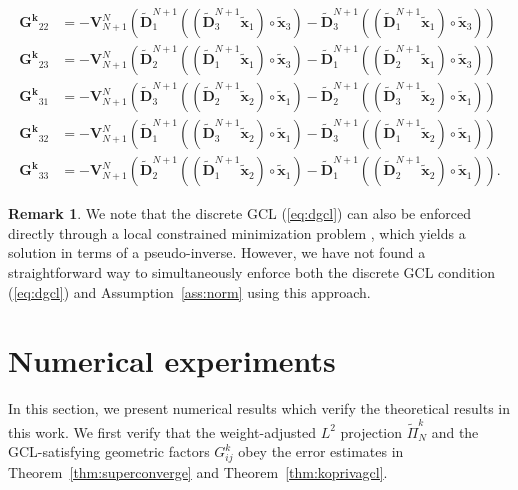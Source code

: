 \documentclass[10pt]{amsart}
\theoremstyle{definition}
\theoremstyle{lemma}
\newtheorem*{remark}{Remark}
\theoremstyle{theorem}
\theoremstyle{assumption}
\renewcommand{\tilde}{\widetilde}
\newcommand{\LRp}[1]{\left( #1 \right)}
\begin{document}
{\begin{align}
\bm{G^k}_{22} &= -\bm{V}_{N+1}^N\LRp{\tilde{\bm{D}}^{N+1}_1 \LRp{ \LRp{\tilde{\bm{D}}^{N+1}_3\tilde{\bm{x}}_1} \circ\tilde{\bm{x}}_3} - \tilde{\bm{D}}^{N+1}_3 \LRp{ \LRp{\tilde{\bm{D}}^{N+1}_1\tilde{\bm{x}}_1 }\circ\tilde{\bm{x}}_3}} \nonumber\\
\bm{G^k}_{23} &= -\bm{V}_{N+1}^N\LRp{\tilde{\bm{D}}^{N+1}_2 \LRp{ \LRp{\tilde{\bm{D}}^{N+1}_1\tilde{\bm{x}}_1} \circ\tilde{\bm{x}}_3} - \tilde{\bm{D}}^{N+1}_1 \LRp{ \LRp{\tilde{\bm{D}}^{N+1}_2\tilde{\bm{x}}_1 }\circ\tilde{\bm{x}}_3}} \nonumber\\
%
\bm{G^k}_{31} &= -\bm{V}_{N+1}^N\LRp{\tilde{\bm{D}}^{N+1}_3 \LRp{ \LRp{\tilde{\bm{D}}^{N+1}_2 \tilde{\bm{x}}_2} \circ\tilde{\bm{x}}_1} - \tilde{\bm{D}}^{N+1}_2 \LRp{ \LRp{\tilde{\bm{D}}^{N+1}_3\tilde{\bm{x}}_2} \circ\tilde{\bm{x}}_1}} \nonumber\\
\bm{G^k}_{32} &= -\bm{V}_{N+1}^N\LRp{\tilde{\bm{D}}^{N+1}_1 \LRp{ \LRp{\tilde{\bm{D}}^{N+1}_3\tilde{\bm{x}}_2} \circ\tilde{\bm{x}}_1} - \tilde{\bm{D}}^{N+1}_3 \LRp{  \LRp{\tilde{\bm{D}}^{N+1}_1\tilde{\bm{x}}_2 }\circ\tilde{\bm{x}}_1}} \nonumber\\
\bm{G^k}_{33} &= -\bm{V}_{N+1}^N\LRp{\tilde{\bm{D}}^{N+1}_2 \LRp{ \LRp{\tilde{\bm{D}}^{N+1}_1\tilde{\bm{x}}_2} \circ\tilde{\bm{x}}_1} - \tilde{\bm{D}}^{N+1}_1 \LRp{  \LRp{\tilde{\bm{D}}^{N+1}_2\tilde{\bm{x}}_2 }\circ\tilde{\bm{x}}_1}}. \nonumber
\end{align}
\begin{remark}

We note that the discrete GCL (\ref{eq:dgcl}) can also be enforced directly through a local constrained minimization problem \cite{fernandez2016simultaneous, crean2018entropy}, which yields a solution in terms of a pseudo-inverse.  However, we have not found a straightforward way to simultaneously enforce both the discrete GCL condition (\ref{eq:dgcl}) and Assumption~\ref{ass:norm} using this approach.
\end{remark}


\section{Numerical experiments}
\label{sec:num}

In this section, we present numerical results which verify the theoretical results in this work.  We first verify that the weight-adjusted $L^2$ projection $\tilde{\Pi}^k_N$ and the GCL-satisfying geometric factors $G^k_{ij}$ obey the error estimates in Theorem~\ref{thm:superconverge} and Theorem~\ref{thm:koprivagcl}.  

}
\end{document}
